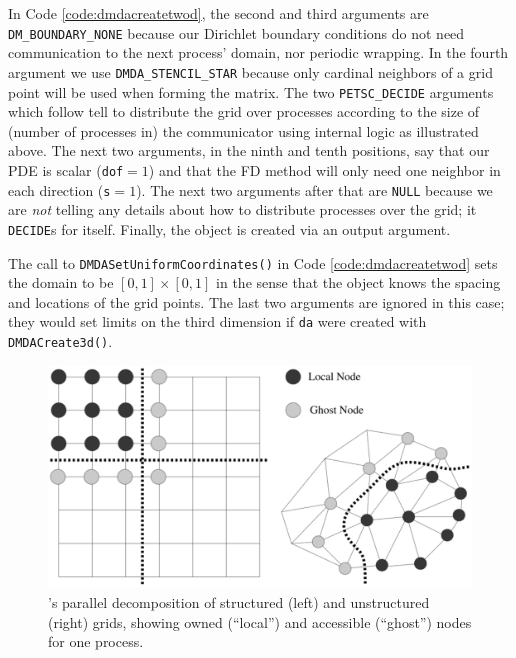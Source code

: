 In Code \ref{code:dmdacreatetwod}, the second and third arguments are \texttt{DM\_BOUNDARY\_NONE} because our Dirichlet boundary conditions do not need communication to the next process' domain, nor periodic wrapping.  In the fourth argument we use \texttt{DMDA\_STENCIL\_STAR} because only cardinal neighbors of a grid point will be used when forming the matrix.  The two \texttt{PETSC\_DECIDE} arguments which follow tell \PETSc to distribute the grid over processes according to the size of (number of processes in) the \MPI communicator using \PETSc internal logic as illustrated above.  The next two arguments, in the ninth and tenth positions, say that our PDE is scalar (\texttt{dof}$=1$) and that the FD method will only need one neighbor in each direction (\texttt{s}$=1$).  The next two arguments after that are \texttt{NULL} because we are \emph{not} telling \PETSc any details about how to distribute processes over the grid; it \texttt{DECIDE}s for itself.  Finally, the \pDMDA object is created via an output argument.

The call to \texttt{DMDASetUniformCoordinates()} in Code \ref{code:dmdacreatetwod} sets the domain to be $[0,1]\times[0,1]$ in the sense that the \pDM object knows the spacing and locations of the grid points.  The last two arguments are ignored in this case; they would set limits on the third dimension if \texttt{da} were created with \texttt{DMDACreate3d()}.

\medskip
\begin{figure}
\includegraphics[width=\textwidth]{figs/petscghostvalues}
\caption{\PETSc's parallel decomposition of structured (left) and unstructured (right) grids, showing owned (``local'') and accessible (``ghost'') nodes for one process.}
\label{fig:petscghostvalues}
\end{figure}


